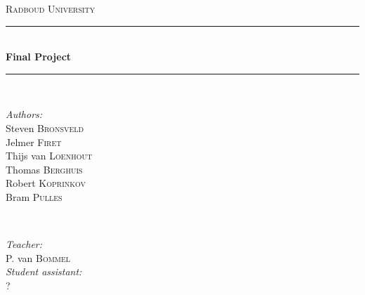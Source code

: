 \documentclass[main.tex]{subfiles}
\begin{document}
\begin{titlepage}
    \newcommand{\HRule}{\rule{\linewidth}{0.5mm}} 
    
    \center 
    \textsc{\LARGE Radboud University}\\[0.5cm] 
    
    \HRule \\[0.4cm]
        {\huge \bfseries Final Project}\\[0.3cm] 
    \HRule \\[1.5cm]
    
    \begin{figure}[ht]
     	\centering
    \end{figure}
    
    \begin{minipage}{0.4\textwidth}
        \begin{flushleft} \large
            \emph{Authors:}\\
            Steven \textsc{Bronsveld} \\
            Jelmer \textsc{Firet} \\
            Thijs van \textsc{Loenhout} \\
            Thomas \textsc{Berghuis} \\
            Robert \textsc{Koprinkov} \\
            Bram \textsc{Pulles} \\
        \end{flushleft}
    \end{minipage}
    ~
    \begin{minipage}{0.4\textwidth}
        \begin{flushright} \large
            \emph{Teacher:} \\
            P. van \textsc{Bommel} \\
            \emph{Student assistant:} \\
            ? 
        \end{flushright}
    \end{minipage}\\[2cm]
    
    \vfill 

\end{titlepage}
\end{document}
